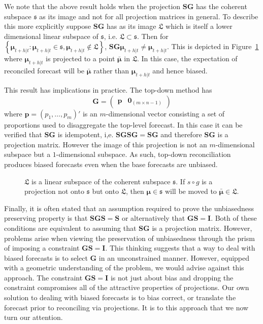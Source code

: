 \documentclass[12pt]{article}
\theoremstyle{definition}
\theoremstyle{property}
\begin{document}
	We note that the above result holds when the projection $\bm{SG}$ has the coherent subspace $\mathfrak{s}$ as its image and not for all projection matrices in general. To describe this more explicitly suppose $\bm{SG}$ has as its image  $\mathfrak{L}$ which is itself a lower dimensional linear subspace of $\mathfrak{s}$, i.e. $\mathfrak{L}\subset\mathfrak{s}$. Then for $\left\{\bm{\mu}_{t+h|t}:\bm{\mu}_{t+h|t}\in\mathfrak{s},\bm{\mu}_{t+h|t}\notin\mathfrak{L}\right\}$,  $\bm{S}\bm{G}\bm{\mu}_{t+h|t} \ne \bm{\mu}_{t+h|t}$. This is depicted in Figure~\ref{fig:Schematic_3D} where $\bm{\mu}_{t+h|t}$ is projected to a point $\bar{\bm{\mu}}$ in $\mathfrak{L}$.  In this case, the expectation of reconciled forecast will be $\bar{\bm{\mu}}$ rather than $\bm{\mu}_{t+h|t}$ and hence biased.  
	
	This result has implications in practice. The top-down method \citep{Gross1990} has 
	\begin{equation}\label{eq:top-downG}
	\bm{G}=\begin{pmatrix}
	\bm{p} & \bm{0}_{(m \times n-1)}
	\end{pmatrix}
	\end{equation}
    where $\bm{p} = (p_1,\dots,p_m)'$ is an $m$-dimensional vector consisting a set of proportions used to disaggregate the top-level forecast.  In this case it can be verified that $\bm{SG}$ is idempotent, i,e. $\bm{SGSG}=\bm{SG}$ and therefore $\bm{SG}$ is a projection matrix.  However the image of this projection is not an $m$-dimensional subspace but a $1$-dimensional subspace.  As such, top-down reconciliation produces biased forecasts even when the base forecasts are unbiased.
		
	\begin{figure}[H]
		\centering
		\vspace{-0.9cm}
		\small
		\resizebox{\linewidth}{!}{
			
		}
		\caption{$\mathfrak{L}$ is a linear subspace of the coherent subspace $\mathfrak{s}$. If $s\circ g$ is a projection not onto $\mathfrak{s}$ but onto $\mathfrak{L}$, then $\bm{\mu} \in \mathfrak{s}$ will be moved to $\bar{\bm{\mu}} \in \mathfrak{L}$.}\label{fig:Schematic_3D}
	\end{figure}
	
	Finally, it is often stated that an assumption required to prove the unbiasedness preserving property is that $\bm{SGS}=\bm{S}$ or alternatively that $\bm{GS}=\bm{I}$.  Both of these conditions are equivalent to assuming that $\bm{SG}$ is a projection matrix.    However, problems arise when viewing the preservation of unbiasedness through the prism of imposing a constraint $\bm{GS}=\bm{I}$. This thinking suggests that a way to deal with biased forecasts is to select $\bm{G}$ in an unconstrained manner.  However, equipped with a geometric understanding of the problem, we would advise against this approach.  The constraint $\bm{GS}=\bm{I}$  is not just about bias and dropping the constraint compromises all of the attractive properties of projections.  Our own solution to dealing with biased forecasts is to bias correct, or translate the forecast prior to reconciling via projections.  It is to this approach that we now turn our attention.
	
\end{document}
